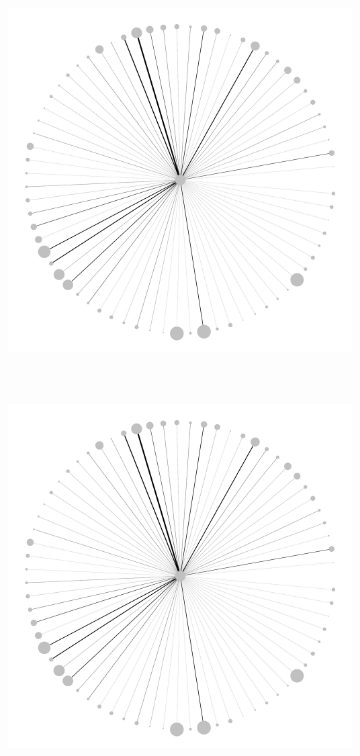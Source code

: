 \documentclass[varwidth, border=0pt]{standalone}
\begin{document}
\begin{figure}
\begin{subfigure}{0.24\linewidth}
\end{subfigure}~%
\begin{subfigure}{0.24\linewidth}
	\centering
	\includegraphics[width=\linewidth]{../../graphics/evolution/reliance-us-dodd-frank-2016.pdf}%
\end{subfigure}~%
\begin{subfigure}{0.24\linewidth}
	\includegraphics[width=\linewidth]{../../graphics/evolution/reliance-us-dodd-frank-2019.pdf}%
\end{subfigure}
	\end{figure}%
\end{document}

